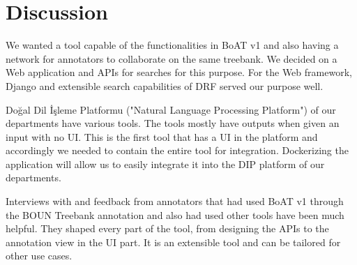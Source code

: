 \section{Discussion}
\label{sec:discussion}

We wanted a tool capable of the functionalities in BoAT v1 and also having a network for annotators to collaborate on the same treebank.
We decided on a Web application and APIs for searches for this purpose.
For the Web framework, Django and extensible search capabilities of DRF served our purpose well.

Doğal Dil İşleme Platformu ("Natural Language Processing Platform") of our departments have various tools.
The tools mostly have outputs when given an input with no UI.
This is the first tool that has a UI in the platform and accordingly we needed to contain the entire tool for integration.
Dockerizing the application will allow us to easily integrate it into the DIP platform of our departments.\cite{DIP}

Interviews with and feedback from annotators that had used BoAT v1 through the BOUN Treebank annotation and also had used other tools have been much helpful.
They shaped every part of the tool, from designing the APIs to the annotation view in the UI part.
It is an extensible tool and can be tailored for other use cases.
